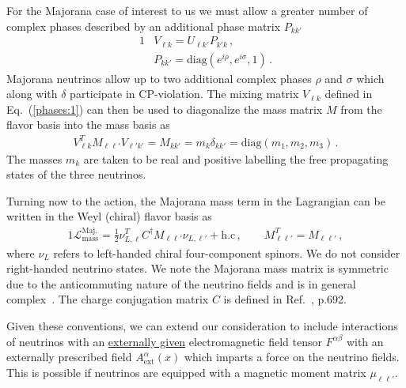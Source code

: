\documentclass[addchapnum]{ws-rv961x669} %
\newcommand{\req}[1]{Eq.~(\ref{#1})}
\begin{document}
For the Majorana case of interest to us we must allow a greater number of complex phases described by an additional phase matrix $P_{kk'}$
\begin{alignat}{1}
	\label{phases:1} &V_{\ell k} = U_{\ell k'}P_{k'k}\,,\\
	\label{phases:3} &P_{kk'} = \mathrm{diag}(e^{i\rho},e^{i\sigma},1)\,.
\end{alignat}
Majorana neutrinos allow up to two additional complex phases $\rho$ and $\sigma$ which along with $\delta$ participate in CP-violation. The mixing matrix $V_{\ell k}$ defined in \req{phases:1} can then be used to diagonalize the mass matrix $M$ from the flavor basis into the mass basis as
\begin{align}
    \label{diag:1}
    V_{\ell k}^{T}M_{\ell\ell'}V_{\ell'k'} = M_{kk'} = m_{k}\delta_{kk'} = \mathrm{diag}(m_{1},m_{2},m_{3})\,.
\end{align}
The masses $m_{k}$ are taken to be real and positive labelling the free propagating states of the three neutrinos.

Turning now to the action, 
the Majorana mass term in the Lagrangian can be written in the Weyl (chiral) flavor basis as
\begin{alignat}{1}
	\label{mass:1} \mathcal{L}_{\mathrm{mass}}^{\mathrm{Maj.}}=\frac{1}{2}\nu_{L,\ell}^{T}C^{\dag}M_{\ell\ell'}\nu_{L,\ell'}+\mathrm{h.c}\,,\qquad
    M_{\ell\ell'}^{T}=M_{\ell\ell'}\,,
\end{alignat}
where $\nu_{L}$ refers to left-handed chiral four-component spinors. We do not consider right-handed neutrino states. We note the Majorana mass matrix is symmetric due to the anticommuting nature of the neutrino fields and is in general complex~\cite{Adhikary:2013bma}. The charge conjugation matrix $C$ is defined in Ref.~\citeauthor{Itzykson:1980rh}, p.692.

Given these conventions, we can extend our consideration to include interactions of neutrinos with an \underline{externally given} electromagnetic field tensor $F^{\alpha\beta}$ with an externally prescribed field $A^{\alpha}_\mathrm{ext}(x)$ which imparts a force on the neutrino fields. This is possible if neutrinos are equipped with a magnetic moment matrix $\mu_{\ell\ell'}$. 
\end{document}
